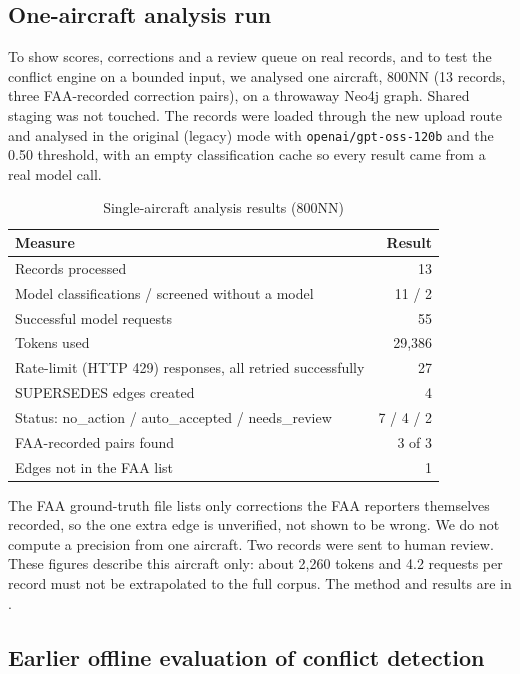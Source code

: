 \subsection{One-aircraft analysis run}

To show scores, corrections and a review queue on real records, and to test the conflict engine on a bounded input, we analysed one aircraft, 800NN (13 records, three FAA-recorded correction pairs), on a throwaway Neo4j graph. Shared staging was not touched. The records were loaded through the new upload route and analysed in the original (legacy) mode with \texttt{openai/gpt-oss-120b} and the 0.50 threshold, with an empty classification cache so every result came from a real model call.

\begin{table}[!htbp]
\centering
\caption{Single-aircraft analysis results (800NN)}
\label{tab:single-aircraft}
\small
\begin{tabularx}{\textwidth}{@{}L r@{}}
\toprule
Measure & Result \\
\midrule
Records processed & 13 \\
Model classifications / screened without a model & 11 / 2 \\
Successful model requests & 55 \\
Tokens used & 29{,}386 \\
Rate-limit (HTTP 429) responses, all retried successfully & 27 \\
SUPERSEDES edges created & 4 \\
Status: no\_action / auto\_accepted / needs\_review & 7 / 4 / 2 \\
FAA-recorded pairs found & 3 of 3 \\
Edges not in the FAA list & 1 \\
\bottomrule
\end{tabularx}
\end{table}

The FAA ground-truth file lists only corrections the FAA reporters themselves recorded, so the one extra edge is unverified, not shown to be wrong. We do not compute a precision from one aircraft. Two records were sent to human review. These figures describe this aircraft only: about 2{,}260 tokens and 4.2 requests per record must not be extrapolated to the full corpus. The method and results are in .

\subsection{Earlier offline evaluation of conflict detection}

